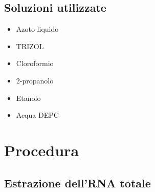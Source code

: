 \subsection{Soluzioni utilizzate}
\begin{itemize}
\item Azoto liquido
\item TRIZOL
\item Cloroformio
\item 2-propanolo
\item Etanolo
\item Acqua DEPC
\end{itemize}

\section{Procedura}

\subsection{Estrazione dell'RNA totale}

